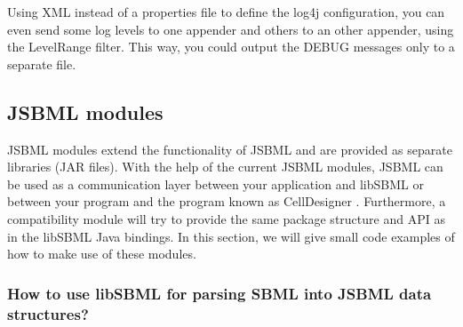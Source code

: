 Using XML instead of a properties file to define the log4j configuration, you can even send
some log levels to one appender and others to an other appender, using the LevelRange filter. 
This way, you could output the DEBUG messages only to a separate file.


\subsection{JSBML modules}

JSBML modules extend the functionality of JSBML and are provided as separate
libraries (JAR files). With the help of the current JSBML modules, JSBML can be
used as a communication layer  between your
application and libSBML \citep{Bornstein2008} or between your program and the
program known as CellDesigner \citep{Funahashi2003}. Furthermore, a
compatibility module
%
will try to provide the same package structure and API as in the libSBML Java
bindings. In this section, we will give small code examples of how to make use
of these modules.

\subsubsection{How to use libSBML for parsing SBML into JSBML data structures?}

